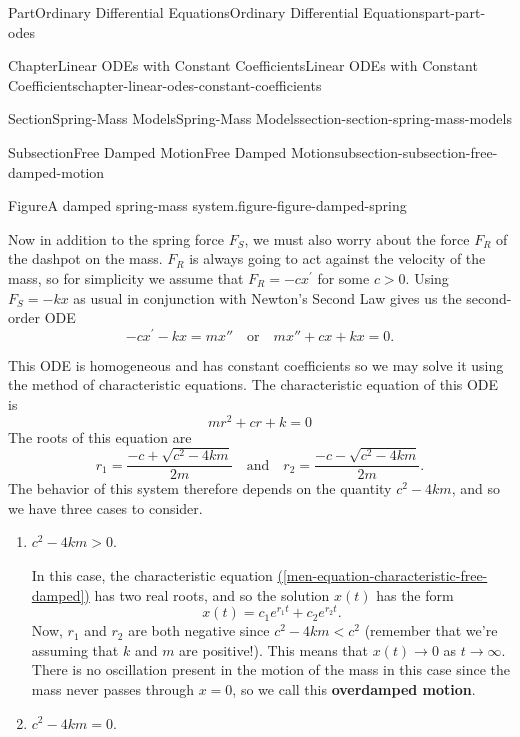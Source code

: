 \documentclass[twoside,10pt,]{book}
\newcommand{\xreffont}{\relax}
\newcommand{\terminology}[1]{\textbf{#1}}
\numberwithin{equation}{part}
\newcommand{\lt}{<}
\newcommand{\gt}{>}
\begin{document}
\begin{partptx}{Part}{Ordinary Differential Equations}{}{Ordinary Differential Equations}{}{}{part-part-odes}
\begin{chapterptx}{Chapter}{Linear ODEs with Constant Coefficients}{}{Linear ODEs with Constant Coefficients}{}{}{chapter-linear-odes-constant-coefficients}
\begin{sectionptx}{Section}{Spring-Mass Models}{}{Spring-Mass Models}{}{}{section-section-spring-mass-models}
\begin{subsectionptx}{Subsection}{Free Damped Motion}{}{Free Damped Motion}{}{}{subsection-subsection-free-damped-motion}
\begin{figureptx}{Figure}{A damped spring-mass system.}{figure-figure-damped-spring}{}
\begin{image}{0}{1}{0}{}
{\begin{tikzpicture}
\end{tikzpicture}
}%
\end{image}%
\tcblower
\end{figureptx}%
Now in addition to the spring force \(F_{S}\), we must also worry about the force \(F_{R}\) of the dashpot on the mass. \(F_{R}\) is always going to act against the velocity of the mass, so for simplicity we assume that \(F_{R} = -cx^\prime\) for some \(c > 0\). Using \(F_{S} = -kx\) as usual in conjunction with Newton's Second Law gives us the second-order ODE%
\begin{equation*}
-cx^\prime-kx = mx''\quad\text{or}\quad mx'' + cx + kx = 0.
\end{equation*}
%
\par
This ODE is homogeneous and has constant coefficients so we may solve it using the method of characteristic equations. The characteristic equation of this ODE is%
\begin{equation}
mr^{2} + cr + k = 0\label{men-equation-characteristic-free-damped}
\end{equation}
The roots of this equation are%
\begin{equation}
r_{1} = \frac{-c + \sqrt{c^{2} - 4km}}{2m}\quad\text{and}\quad r_{2} = \frac{-c - \sqrt{c^{2} - 4km}}{2m}.\label{men-equation-characteristic-free-damped-roots}
\end{equation}
The behavior of this system therefore depends on the quantity \(c^{2} - 4km\), and so we have three cases to consider.%
%
\begin{enumerate}[label=\arabic*:]
\item{}\(c^{2} - 4km \gt 0\).%
\par
In this case, the characteristic equation \hyperref[men-equation-characteristic-free-damped]{({\xreffont\ref{men-equation-characteristic-free-damped}})} has two real roots, and so the solution \(x(t)\) has the form%
\begin{equation*}
x(t) = c_{1}e^{r_{1}t} + c_{2}e^{r_{2}t}.
\end{equation*}
Now, \(r_{1}\) and \(r_{2}\) are both negative since \(c^{2} - 4km \lt c^{2}\) (remember that we're assuming that \(k\) and \(m\) are positive!). This means that \(x(t)\to0\) as \(t\to\infty\). There is no oscillation present in the motion of the mass in this case since the mass never passes through \(x = 0\), so we call this \terminology{overdamped motion}.%
\item{}\(c^{2} - 4km = 0\).%
\par

\end{enumerate}
\end{subsectionptx}
\end{sectionptx}
\end{chapterptx}
\end{partptx}
\end{document}
